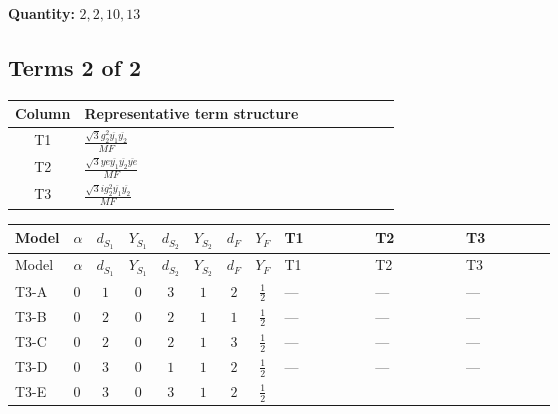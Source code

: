 \documentclass[8pt]{article}
\begin{document}
\begin{landscape}
\begin{longtable}{@{}llcccccc >{\raggedright\arraybackslash}p{0.21\linewidth} >{\raggedright\arraybackslash}p{0.21\linewidth} >{\raggedright\arraybackslash}p{0.21\linewidth}@{}}
\midrule
\bottomrule
\end{longtable}
\clearpage
\noindent\textbf{Quantity: }$\mathrm{2,2,10,13}$\par\smallskip
\subsection*{Terms 2 of 2}
\begin{center}
\begin{tabular}{@{}c >{\raggedright\arraybackslash}p{0.82\linewidth}@{}}
\toprule
Column & Representative term structure \\
\midrule
T1 & \(\displaystyle \frac{\sqrt{3} g_{2}^{2} \overline{y_{1}} \overline{y_{2}}}{MF}\) \\
\midrule
T2 & \(\displaystyle \frac{\sqrt{3} ye \overline{y_{1}} \overline{y_{2}} \overline{ye}}{MF}\) \\
\midrule
T3 & \(\displaystyle \frac{\sqrt{3} i g_{2}^{2} \overline{y_{1}} \overline{y_{2}}}{MF}\) \\
\midrule
\bottomrule
\end{tabular}
\end{center}
\smallskip
\tiny
\begin{longtable}{@{}llcccccc >{\raggedright\arraybackslash}p{0.21\linewidth} >{\raggedright\arraybackslash}p{0.21\linewidth} >{\raggedright\arraybackslash}p{0.21\linewidth}@{}}
\toprule
Model & $\alpha$ & $d_{S_1}$ & $Y_{S_1}$ & $d_{S_2}$ & $Y_{S_2}$ & $d_F$ & $Y_F$ & T1 & T2 & T3 \\
\midrule
\endfirsthead
\toprule
Model & $\alpha$ & $d_{S_1}$ & $Y_{S_1}$ & $d_{S_2}$ & $Y_{S_2}$ & $d_F$ & $Y_F$ & T1 & T2 & T3 \\
\midrule
\endhead
T3-A & $0$ & $1$ & $0$ & $3$ & $1$ & $2$ & $\frac{1}{2}$ & --- & --- & --- \\
\midrule
T3-B & $0$ & $2$ & $0$ & $2$ & $1$ & $1$ & $\frac{1}{2}$ & --- & --- & --- \\
\midrule
T3-C & $0$ & $2$ & $0$ & $2$ & $1$ & $3$ & $\frac{1}{2}$ & --- & --- & --- \\
\midrule
T3-D & $0$ & $3$ & $0$ & $1$ & $1$ & $2$ & $\frac{1}{2}$ & --- & --- & --- \\
\midrule
T3-E & $0$ & $3$ & $0$ & $3$ & $1$ & $2$ & $\frac{1}{2}$ & \scriptsize\adjustbox{max width=\linewidth}{$\begin{gathered} \frac{11 \sqrt{3} g_{2}^{2} \overline{y_{1}} \overline{y_{2}}}{8 MF}\end{gathered}$} & \scriptsize\adjustbox{max width=\linewidth}{$\begin{gathered} - \frac{\sqrt{3} ye \overline{y_{1}} \overline{y_{2}} \overline{ye}}{12 MF}\end{gathered}$} & \scriptsize\adjustbox{max width=\linewidth}{$\begin{gathered} \frac{\sqrt{3} i g_{2}^{2} \overline{y_{1}} \overline{y_{2}}}{6 MF}\end{gathered}$} \\
\midrule
\bottomrule
\end{longtable}
\clearpage

\end{landscape}
\end{document}
